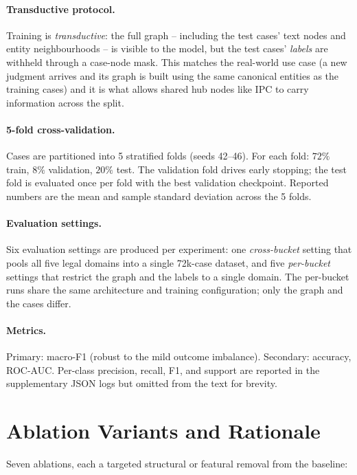 \paragraph{Transductive protocol.} Training is \emph{transductive}: the
full graph -- including the test cases' text nodes and entity
neighbourhoods -- is visible to the model, but the test cases'
\emph{labels} are withheld through a case-node mask. This matches the
real-world use case (a new judgment arrives and its graph is built
using the same canonical entities as the training cases) and it is
what allows shared hub nodes like \textsc{IPC} to carry information
across the split.

\paragraph{5-fold cross-validation.} Cases are partitioned into 5
stratified folds (seeds 42--46). For each fold: $72\%$ train,
$8\%$ validation, $20\%$ test. The validation fold drives early
stopping; the test fold is evaluated once per fold with the best
validation checkpoint. Reported numbers are the mean and sample
standard deviation across the 5 folds.

\paragraph{Evaluation settings.} Six evaluation settings are produced
per experiment: one \emph{cross-bucket} setting that pools all five
legal domains into a single 72k-case dataset, and five
\emph{per-bucket} settings that restrict the graph and the labels to
a single domain. The per-bucket runs share the same architecture and
training configuration; only the graph and the cases differ.

\paragraph{Metrics.} Primary: macro-F1 (robust to the mild outcome
imbalance). Secondary: accuracy, ROC-AUC. Per-class precision,
recall, F1, and support are reported in the supplementary JSON logs
but omitted from the text for brevity.

\section{Ablation Variants and Rationale}

Seven ablations, each a targeted structural or featural removal from
the baseline:

